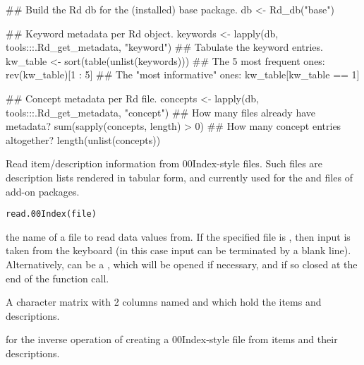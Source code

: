 \begin{Examples}
\begin{ExampleCode}
## Build the Rd db for the (installed) base package.
db <- Rd_db("base")

## Keyword metadata per Rd object.
keywords <- lapply(db, tools:::.Rd_get_metadata, "keyword")
## Tabulate the keyword entries.
kw_table <- sort(table(unlist(keywords)))
## The 5 most frequent ones:
rev(kw_table)[1 : 5]
## The "most informative" ones:
kw_table[kw_table == 1]

## Concept metadata per Rd file.
concepts <- lapply(db, tools:::.Rd_get_metadata, "concept")
## How many files already have \concept metadata?
sum(sapply(concepts, length) > 0)
## How many concept entries altogether?
length(unlist(concepts))
\end{ExampleCode}
\end{Examples}
%
\begin{Description}\relax
Read item/description information from 00Index-style files.  Such
files are description lists rendered in tabular form, and currently
used for the  and  files of add-on
packages.
\end{Description}
%
\begin{Usage}
\begin{verbatim}
read.00Index(file)
\end{verbatim}
\end{Usage}
%
\begin{Arguments}
\begin{ldescription}
\item[\code{file}] the name of a file to read data values from.  If the
specified file is , then input is taken from the keyboard
(in this case input can be terminated by a blank line).
Alternatively,  can be a , which
will be opened if necessary, and if so closed at the end of the
function call.
\end{ldescription}
\end{Arguments}
%
\begin{Value}
A character matrix with 2 columns named  and
 which hold the items and descriptions.
\end{Value}
%
\begin{SeeAlso}\relax
{} for the inverse operation of creating a
00Index-style file from items and their descriptions.
\end{SeeAlso}
